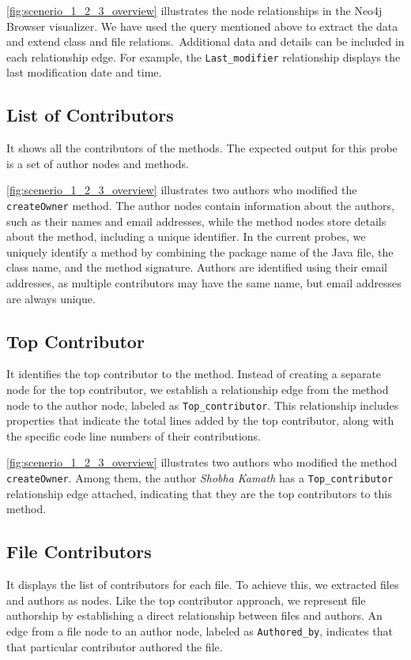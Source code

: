 \autoref{fig:scenerio_1_2_3_overview} illustrates the node relationships in the Neo4j Browser visualizer. We have used the query mentioned above to extract the data and extend class and file relations.\ Additional data and details can be included in each relationship edge. For example, the \texttt{Last\_modifier} relationship displays the last modification date and time.

\subsection{List of Contributors}
It shows all the contributors of the methods. The expected output for this probe is a set of author nodes and methods.

\autoref{fig:scenerio_1_2_3_overview} illustrates two authors who modified the \texttt{createOwner} method. The author nodes contain information about the authors, such as their names and email addresses, while the method nodes store details about the method, including a unique identifier. In the current probes, we uniquely identify a method by combining the package name of the Java file, the class name, and the method signature. Authors are identified using their email addresses, as multiple contributors may have the same name, but email addresses are always unique.

\subsection{Top Contributor}
It identifies the top contributor to the method. Instead of creating a separate node for the top contributor, we establish a relationship edge from the method node to the author node, labeled as \texttt{Top\_contributor}. This relationship includes properties that indicate the total lines added by the top contributor, along with the specific code line numbers of their contributions.

\autoref{fig:scenerio_1_2_3_overview} illustrates two authors who modified the method \texttt{createOwner}. Among them, the author \textit{Shobha Kamath} has a \texttt{Top\_contributor} relationship edge attached, indicating that they are the top contributors to this method.

\subsection{File Contributors}
It displays the list of contributors for each file. To achieve this, we extracted files and authors as nodes. Like the top contributor approach, we represent file authorship by establishing a direct relationship between files and authors. An edge from a file node to an author node, labeled as \texttt{Authored\_by}, indicates that that particular contributor authored the file.

